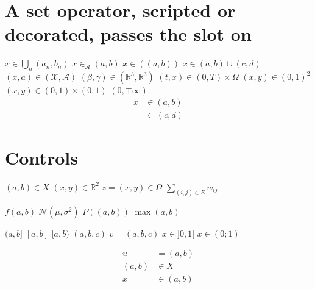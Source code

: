 \documentclass{article}
\begin{document}
\section{A set operator, scripted or decorated, passes the slot on}
$x\in\bigcup_n(a_n,b_n)$ $x\in_{\mathcal{A}}(a,b)$ $x\in((a,b))$ $x\in(a,b)\cup(c,d)$ $(x,a)\in(\mathcal{X},\mathcal{A})$
$(\beta,\gamma)\in(\mathbb{R}^{3},\mathbb{R}^{3})$ $(t,x)\in(0,T)\times\Omega$ $(x,y)\in(0,1)^2$ $(x,y)\in(0,1)\times(0,1)$ $(0,\mp\infty)$
\begin{equation}\begin{split}x&\in(a,b)\\&\subset(c,d)\end{split}\end{equation}

\section{Controls}
$(a,b)\in X$ $(x,y)\in\mathbb{R}^2$ $z=(x,y)\in\Omega$ $\sum_{(i,j)\in E}w_{ij}$

$f(a,b)$ $\mathcal{N}(\mu,\sigma^2)$ $P((a,b))$ $\max(a,b)$

$(a,b]$ $[a,b]$ $[a,b)$ $(a,b,c)$ $v=(a,b,c)$ $x\in]0,1[$ $x\in(0;1)$

\begin{align}
u&=(a,b)\\
(a,b)&\in X\\
x&\in(a,b)
\end{align}
\end{document}

